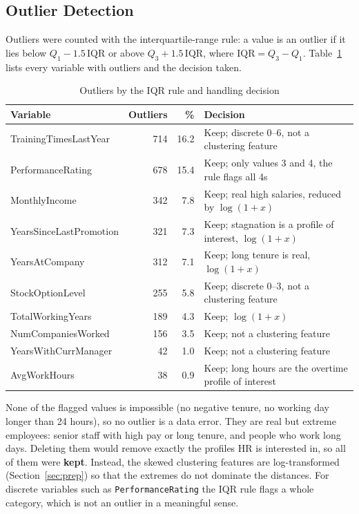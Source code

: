 \documentclass[12pt,a4paper]{article}
\begin{document}
\subsection{Outlier Detection}

Outliers were counted with the interquartile-range rule: a value is an
outlier if it lies below $Q_1 - 1.5\,\mathrm{IQR}$ or above
$Q_3 + 1.5\,\mathrm{IQR}$, where $\mathrm{IQR} = Q_3 - Q_1$.
Table~\ref{tab:outliers} lists every variable with outliers and the decision
taken.

\begin{table}[H]
\centering
\caption{Outliers by the IQR rule and handling decision}
\label{tab:outliers}
\small
\begin{tabularx}{\textwidth}{>{\raggedright\arraybackslash}p{4.3cm} r r >{\raggedright\arraybackslash}X}
\toprule
\textbf{Variable} & \textbf{Outliers} & \textbf{\%} & \textbf{Decision}\\
\midrule
TrainingTimesLastYear   & 714 & 16.2 & Keep; discrete 0--6, not a clustering feature\\
PerformanceRating       & 678 & 15.4 & Keep; only values 3 and 4, the rule flags all 4s\\
MonthlyIncome           & 342 & 7.8  & Keep; real high salaries, reduced by $\log(1+x)$\\
YearsSinceLastPromotion & 321 & 7.3  & Keep; stagnation is a profile of interest, $\log(1+x)$\\
YearsAtCompany          & 312 & 7.1  & Keep; long tenure is real, $\log(1+x)$\\
StockOptionLevel        & 255 & 5.8  & Keep; discrete 0--3, not a clustering feature\\
TotalWorkingYears       & 189 & 4.3  & Keep; $\log(1+x)$\\
NumCompaniesWorked      & 156 & 3.5  & Keep; not a clustering feature\\
YearsWithCurrManager    & 42  & 1.0  & Keep; not a clustering feature\\
AvgWorkHours            & 38  & 0.9  & Keep; long hours are the overtime profile of interest\\
\bottomrule
\end{tabularx}
\end{table}

None of the flagged values is impossible (no negative tenure, no working day
longer than 24 hours), so no outlier is a data error. They are real but
extreme employees: senior staff with high pay or long tenure, and people who
work long days. Deleting them would remove exactly the profiles HR is
interested in, so all of them were \textbf{kept}. Instead, the skewed
clustering features are log-transformed (Section~\ref{sec:prep}) so that the
extremes do not dominate the distances. For discrete variables such as
\texttt{PerformanceRating} the IQR rule flags a whole category, which is not an
outlier in a meaningful sense.
\end{document}
